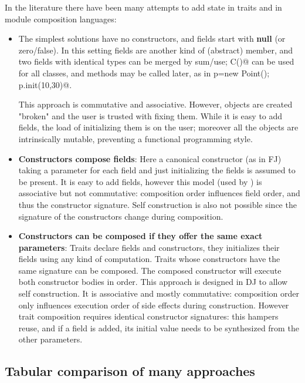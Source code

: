 In the literature there have been many attempts to add state in traits and in module composition languages:
\begin{itemize}  
\item The simplest solutions have no constructors, and fields start with {\bf null} (or zero/false).
In this setting fields are another kind of (abstract) member, and two fields with identical types can be merged by sum/use; \Q@new C()@ can be used for all classes, and \Q@init@ methods may be called later, as in
  \Q@Point p=new Point(); p.init(10,30)@.
  
This approach is commutative and associative.
  However, objects are created "broken" and the user is trusted with fixing them.
  While it is easy to add fields, the load of initializing them is on the user; moreover
    all the objects are intrinsically mutable, preventing a functional programming style.
\item {\bf Constructors compose fields}:
Here a canonical constructor (as in FJ) taking a parameter for each field and just initializing the fields is assumed to be present.
It is easy to add fields, however this model (used by \cite{fjig}) is associative but not commutative: composition order influences field order, and thus the constructor signature.
Self construction is also not possible 
since the signature of the constructors change during composition.


\item {\bf Constructors can be composed if they offer the same exact parameters}:
Traits declare fields and constructors, they initializes their fields using any kind of computation.
Traits whose constructors have the same signature can be composed.
The composed constructor will execute both constructor bodies in order.
This approach is designed in DJ to allow self construction.
It is associative and mostly commutative: composition order only influences execution order of side effects during construction.
However trait composition requires identical constructor signatures: this
hampers reuse, and if a field is added, its initial value needs to be
synthesized from the other parameters.
\end{itemize}
\saveSpace\saveSpace
\subsection{Tabular comparison of many approaches}
\saveSpace


